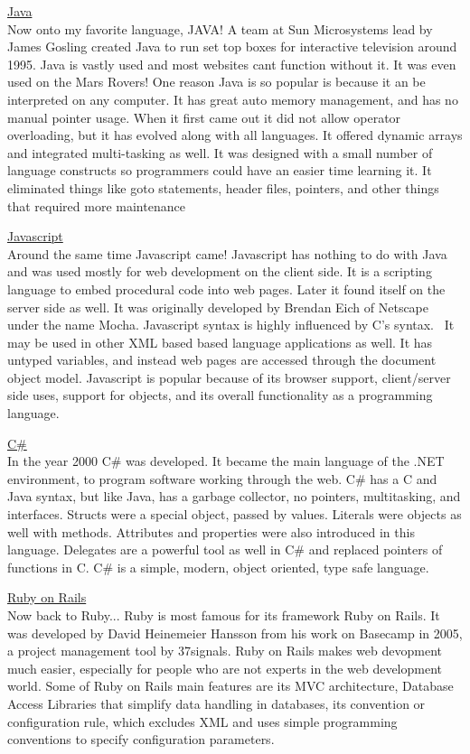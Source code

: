 \documentclass[letterpaper, 10 pt, conference]{IEEEtran}
\begin{document}
\noindent \underline{Java}\\
Now onto my favorite language, JAVA! A team at Sun Microsystems lead by James Gosling created Java to run set top boxes for interactive television around 1995. Java is vastly used and most websites cant function without it. It was even used on the Mars Rovers! One reason Java is so popular is because it an be interpreted on any computer. It has great auto memory management, and has no manual pointer usage. When it first came out it did not allow operator overloading, but it has evolved along with all languages. It offered dynamic arrays and integrated multi-tasking as well. It was designed with a small number of language constructs so programmers could have an easier time learning it. It eliminated things like goto statements, header files, pointers, and other things that required more maintenance\bigskip

\noindent \underline{Javascript}\\
Around the same time Javascript came! Javascript has nothing to do with Java and was used mostly for web development on the client side. It is a scripting language to embed procedural code into web pages. Later it found itself on the server side as well. It was originally developed by Brendan Eich of Netscape under the name Mocha. Javascript syntax is highly influenced by C's syntax.~\cite{History} It may be used in other XML based based language applications as well. It has untyped variables, and instead web pages are accessed through the document object model. Javascript is popular because of its browser support, client/server side uses, support for objects, and its overall functionality as a programming language. \bigskip

\noindent \underline{C\#}\\
In the year 2000 C\# was developed. It became the main language of the .NET environment, to program software working through the web. C\# has a C and Java syntax, but like Java, has a garbage collector, no pointers, multitasking, and interfaces. Structs were a special object, passed by values. Literals were objects as well with methods. Attributes and properties were also introduced in this language. Delegates are a powerful tool as well in C\# and replaced pointers of functions in C. C\# is a simple, modern, object oriented, type safe language. \bigskip

\noindent \underline{Ruby on Rails}\\
Now back to Ruby... Ruby is most famous for its framework Ruby on Rails. It was developed by David Heinemeier Hansson from his work on Basecamp in 2005, a project management tool by 37signals. Ruby on Rails makes web devopment much easier, especially for people who are not experts in the web development world. Some of Ruby on Rails main features are its MVC architecture, Database Access Libraries that simplify data handling in databases, its convention or configuration rule, which excludes XML and uses simple programming conventions to specify configuration parameters.\bigskip
\end{document}
